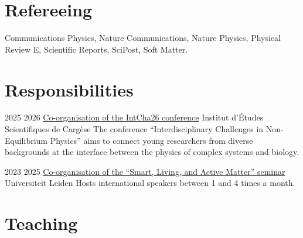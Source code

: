 \documentclass[a4paper]{cvtemplate_en} %
\begin{document}
\section{Refereeing}

Communications Physics, Nature Communications, Nature Physics, Physical Review E,  Scientific Reports, SciPost, Soft Matter.
\vspace{25pt}


\section{Responsibilities}

\begin{cvbody}

\cvitem
    {2025}
    {2026}
    {\href{https://intcha26.sciencesconf.org}{Co-organisation of the IntCha26 conference}}
    {Institut d'\'Etudes Scientifiques de Carg\`ese }
    {}{}{}
    {}
    {The conference ``Interdisciplinary Challenges in Non-Equilibrium Physics'' aims to connect young researchers from diverse backgrounds at the interface between the physics of complex systems and biology.\vspace{5pt}}

\cvitem
	{2023}
	{2025}
	{\href{https://slam-leiden.nl}{Co-organisation of the ``Smart, Living, and Active Matter'' seminar}}
	{Universiteit Leiden }
	{}{}{}
    {}
	{Hosts international speakers between 1 and 4 times a month.\vspace{12.5pt}}

\end{cvbody}


\section{Teaching}
\end{document}
